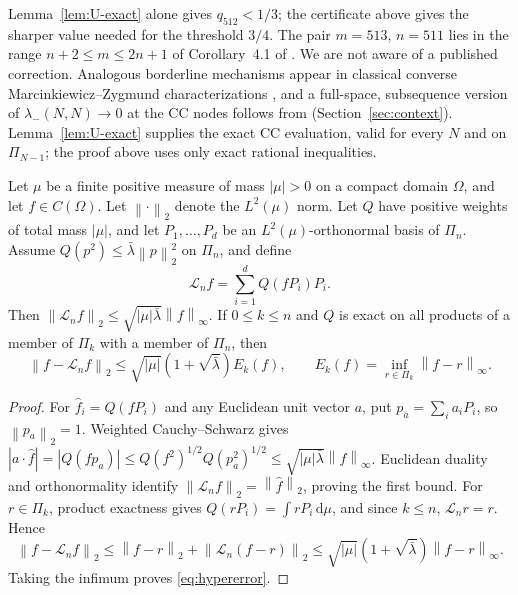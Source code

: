 \documentclass{siamart251216}
\newcommand{\Pn}{\Pi}
\newcommand{\norm}[1]{\left\lVert#1\right\rVert}
\newcommand{\dd}{\,\mathrm d}
\begin{document}
Lemma~\ref{lem:U-exact} alone gives $q_{512}<1/3$; the certificate above
gives the sharper value needed for the threshold $3/4$. The pair $m=513$,
$n=511$ lies in the range $n+2\le m\le2n+1$ of Corollary~4.1 of
\cite{LIT-046}. We are not aware of a published correction. Analogous
borderline mechanisms appear in classical converse Marcinkiewicz--Zygmund
characterizations \cite{LIT-293,LIT-294}, and a full-space, subsequence
version of $\lambda_-(N,N)\to0$ at the CC nodes follows from \cite{LIT-299}
(Section~\ref{sec:context}). Lemma~\ref{lem:U-exact} supplies the exact CC
evaluation, valid for every $N$ and on $\Pn_{N-1}$; the proof above uses only
exact rational inequalities.

\begin{proposition}\label{prop:hyper}%
Let $\mu$ be a finite positive measure of mass $|\mu|>0$ on a compact
domain $\Omega$, and let $f\in C(\Omega)$. Let $\norm\cdot_2$ denote the
$L^2(\mu)$ norm. Let $Q$ have positive weights of total mass $|\mu|$, and let
$P_1,\ldots,P_d$ be an $L^2(\mu)$-orthonormal basis of $\Pn_n$.
Assume $Q(p^2)\le\bar\lambda\norm p_2^2$ on $\Pn_n$, and define
\[
 \mathcal L_nf=\sum_{i=1}^d Q(fP_i)P_i.
\]
Then $\norm{\mathcal L_nf}_2\le\sqrt{|\mu|\bar\lambda}\norm f_\infty$.
If $0\le k\le n$ and $Q$ is exact on all products of a member of
$\Pn_k$ with a member of $\Pn_n$, then
\begin{equation}\label{eq:hypererror}
 \norm{f-\mathcal L_nf}_2\le\sqrt{|\mu|}(1+\sqrt{\bar\lambda})E_k(f),\qquad
 E_k(f)=\inf_{r\in\Pn_k}\norm{f-r}_\infty.
\end{equation}
\end{proposition}
\begin{proof}
For $\hat f_i=Q(fP_i)$ and any Euclidean unit vector $a$, put
$p_a=\sum_i a_iP_i$, so $\norm{p_a}_2=1$.
Weighted Cauchy--Schwarz gives
$|a\cdot\hat f|=|Q(fp_a)|\le Q(f^2)^{1/2}Q(p_a^2)^{1/2}
\le\sqrt{|\mu|\bar\lambda}\norm f_\infty$.
Euclidean duality and orthonormality identify
$\norm{\mathcal L_nf}_2=\norm{\hat f}_2$, proving the first bound.
For $r\in\Pn_k$, product exactness gives
$Q(rP_i)=\int rP_i\dd\mu$, and since $k\le n$,
$\mathcal L_nr=r$. Hence
\[
 \norm{f-\mathcal L_nf}_2
 \le\norm{f-r}_2+\norm{\mathcal L_n(f-r)}_2
 \le\sqrt{|\mu|}(1+\sqrt{\bar\lambda})\norm{f-r}_\infty.
\]
Taking the infimum proves \eqref{eq:hypererror}.
\end{proof}
\end{document}
